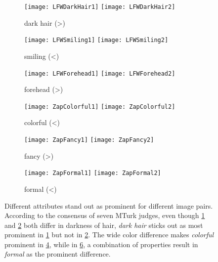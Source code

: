 \documentclass[10pt,twocolumn,letterpaper]{article}
\begin{document}
\begin{figure}
    \centering
    \captionsetup[subfigure]{justification=centering,font=footnotesize,labelfont=footnotesize}
    
    \begin{subfigure}[c]{0.3\linewidth}
        \centering
        \texttt{[image: LFWDarkHair1]}
        \texttt{[image: LFWDarkHair2]}
        \caption{dark hair (\textgreater)}
        \label{fig:example1}
    \end{subfigure}
    \hfill
    \begin{subfigure}[c]{0.3\linewidth}
        \centering
        \texttt{[image: LFWSmiling1]}
        \texttt{[image: LFWSmiling2]}
        \caption{smiling (\textless)}
        \label{fig:example2}
    \end{subfigure}
    \hfill
    \begin{subfigure}[c]{0.3\linewidth}
        \centering
        \texttt{[image: LFWForehead1]}
        \texttt{[image: LFWForehead2]}
        \caption{forehead (\textgreater)}
        \label{fig:example3}
    \end{subfigure}
    
    \vspace{0.25cm}
    
    \begin{subfigure}[c]{0.3\linewidth}
        \centering
        \texttt{[image: ZapColorful1]}
        \texttt{[image: ZapColorful2]}
        \caption{colorful (\textless)}
        \label{fig:example4}
    \end{subfigure}
    \hfill
    \begin{subfigure}[c]{0.3\linewidth}
        \centering
        \texttt{[image: ZapFancy1]}
        \texttt{[image: ZapFancy2]}
        \caption{fancy (\textgreater)}
        \label{fig:example5}
    \end{subfigure}
    \hfill
    \begin{subfigure}[c]{0.3\linewidth}
        \centering
        \texttt{[image: ZapFormal1]}
        \texttt{[image: ZapFormal2]}
        \caption{formal (\textless)}
        \label{fig:example6}
    \end{subfigure}
    
    \vspace{0.1cm}
    
    \caption[Prominent Differences in Image Pairs]{Different attributes stand out as prominent for different image pairs. According to the consensus of seven MTurk judges, even though \ref{fig:example1} and \ref{fig:example2} both differ in darkness of hair, \textit{dark hair} sticks out as most prominent in \ref{fig:example1} but not in \ref{fig:example2}. The wide color difference makes \textit{colorful} prominent in \ref{fig:example4}, while in \ref{fig:example6}, a combination of properties result in \textit{formal} as the prominent difference.}
    \label{fig:prominentdifferencesintro}
\end{figure}
\end{document}
